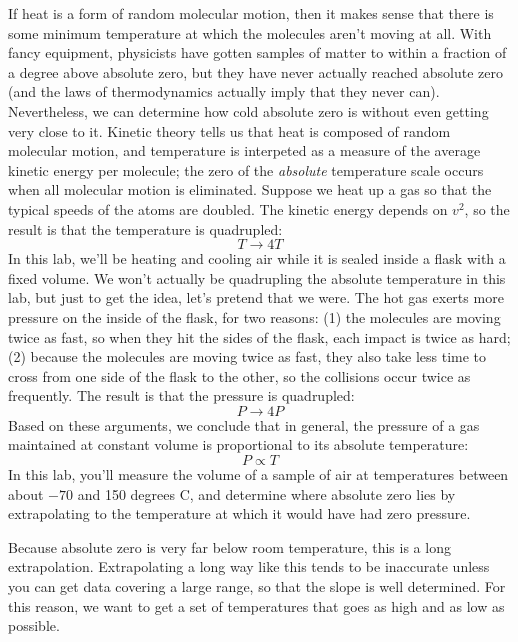 If heat is a form of random molecular motion, then it makes
sense that there is some minimum temperature at which the
molecules aren't moving at all. With fancy equipment,
physicists have gotten samples of matter to within a
fraction of a degree above absolute zero, but they have
never actually reached absolute zero (and the laws of
thermodynamics actually imply that they never can).
Nevertheless, we can determine how cold absolute zero is
without even getting very close to it. Kinetic theory tells
us that heat is composed of random molecular motion, and
temperature is interpeted as a measure of the average
kinetic energy per molecule; the zero of the \emph{absolute}
temperature scale occurs when all molecular motion is eliminated.
Suppose we heat up a gas so that the typical speeds of
the atoms are doubled. The kinetic energy depends on $v^2$,
so the result is that the temperature is quadrupled:
\begin{equation*}
  T \rightarrow 4T
\end{equation*}
In this lab, we'll be heating and cooling air while it
is sealed inside a flask with a fixed volume. We won't
actually be quadrupling the absolute temperature in this
lab, but just to get the idea, let's pretend that we were.
The hot gas exerts more pressure on the inside of the flask,
for two reasons: (1) the molecules are moving twice as fast,
so when they hit the sides of the flask, each impact is
twice as hard; (2) because the molecules are moving twice
as fast, they also take less time to cross from one side
of the flask to the other, so the collisions occur twice
as frequently. The result is that the pressure is quadrupled:
\begin{equation*}
  P \rightarrow 4P
\end{equation*}
Based on these arguments, we conclude that in general, the
pressure of a gas maintained at constant volume is proportional
to its absolute temperature:
\begin{equation*}
  P \propto T
\end{equation*}
In this lab, you'll measure
the volume of a sample of air at temperatures between about $-70$ and
150 degrees C, and determine where absolute zero lies by
extrapolating to the temperature at which it would
have had zero pressure.

Because absolute zero is very far below room temperature, this is a long extrapolation.
Extrapolating a long way like this tends to be inaccurate unless you can get data
covering a large range, so that the slope is well determined. For this reason,
we want to get a set of temperatures that goes as high and as low as possible.

